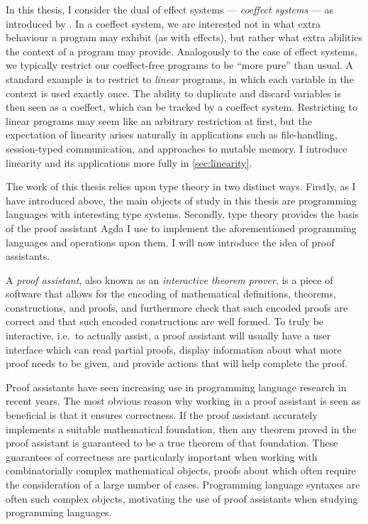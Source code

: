 In this thesis, I consider the dual of effect systems ---
\emph{coeffect systems} --- as introduced by \citet{POM14}.
In a coeffect system, we are interested not in what extra behaviour a program
may exhibit (as with effects), but rather what extra abilities the context of a
program may provide.
Analogously to the case of effect systems, we typically restrict our
coeffect-free programs to be ``more pure'' than usual.
A standard example is to restrict to \emph{linear} programs, in which each
variable in the context is used exactly once.
The ability to duplicate and discard variables is then seen as a coeffect, which
can be tracked by a coeffect system.
Restricting to linear programs may seem like an arbitrary restriction at first,
but the expectation of linearity arises naturally in applications such as
file-handling, session-typed communication, and approaches to mutable memory.
I introduce linearity and its applications more fully in \cref{sec:linearity}.



The work of this thesis relies upon type theory in two distinct ways.
Firstly, as I have introduced above, the main objects of study in this thesis
are programming languages with interesting type systems.
Secondly, type theory provides the basis of the proof assistant Agda I
use to implement the aforementioned programming languages and operations upon
them.
I will now introduce the idea of proof assistants.

A \emph{proof assistant}, also known as an \emph{interactive theorem prover}, is
a piece of software that allows for the encoding of mathematical definitions,
theorems, constructions, and proofs, and furthermore check that such encoded
proofs are correct and that such encoded constructions are well formed.
To truly be interactive, i.e.\ to actually assist, a proof assistant will
usually have a user interface which can read partial proofs, display
information about what more proof needs to be given, and provide actions that
will help complete the proof.

Proof assistants have seen increasing use in programming language research in
recent years.
The most obvious reason why working in a proof assistant is seen as beneficial
is that it ensures correctness.
If the proof assistant accurately implements a suitable mathematical foundation,
then any theorem proved in the proof assistant is guaranteed to be a true
theorem of that foundation.
These guarantees of correctness are particularly important when working with
combinatorially complex mathematical objects, proofs about which often require
the consideration of a large number of cases.
Programming language syntaxes are often such complex objects, motivating the use
of proof assistants when studying programming languages.


